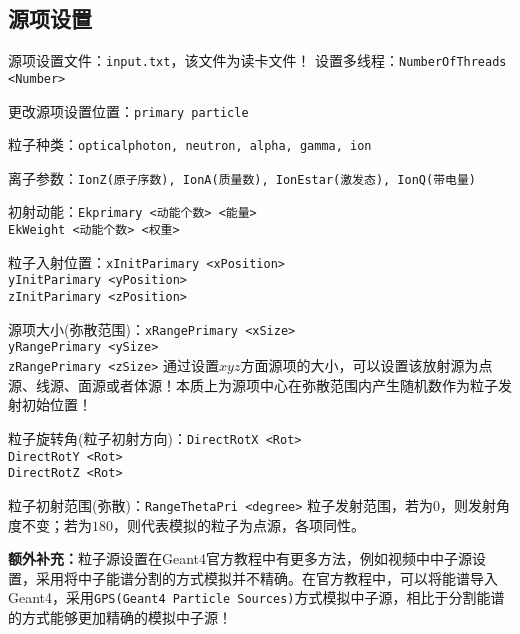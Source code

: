 \documentclass{article}
\begin{document}
\subsection{源项设置}
源项设置文件：\texttt{input.txt}，该文件为读卡文件！
\newline
设置多线程：\texttt{NumberOfThreads <Number>}

更改源项设置位置：\texttt{primary particle}

粒子种类：\texttt{opticalphoton, neutron, alpha, gamma, ion}

离子参数：\texttt{IonZ(原子序数), IonA(质量数), IonEstar(激发态), IonQ(带电量)}

初射动能：\texttt{Ekprimary <动能个数> <能量>} \\
\hspace*{2.5cm} \texttt{EkWeight <动能个数> <权重>}

粒子入射位置：\texttt{xInitParimary <xPosition>} \\
\hspace*{3.2cm} \texttt{yInitParimary <yPosition>} \\
\hspace*{3.2cm} \texttt{zInitParimary <zPosition>}

源项大小(弥散范围)：\texttt{xRangePrimary <xSize>} \\
\hspace*{2.5cm} \texttt{yRangePrimary <ySize>} \\
\hspace*{2.5cm} \texttt{zRangePrimary <zSize>}
\newline
通过设置$ xyz $方面源项的大小，可以设置该放射源为点源、线源、面源或者体源！本质上为源项中心在弥散范围内产生随机数作为粒子发射初始位置！

粒子旋转角(粒子初射方向)：\texttt{DirectRotX <Rot>} \\
\hspace*{5.5cm} \texttt{DirectRotY <Rot>} \\
\hspace*{5.5cm} \texttt{DirectRotZ <Rot>}

粒子初射范围(弥散)：\texttt{RangeThetaPri <degree>}
\newline
粒子发射范围，若为$ 0 $，则发射角度不变；若为$ 180 $，则代表模拟的粒子为点源，各项同性。

\textbf{额外补充：}粒子源设置在Geant4官方教程中有更多方法，例如视频中中子源设置，采用将中子能谱分割的方式模拟并不精确。在官方教程中，可以将能谱导入Geant4，采用\texttt{GPS(Geant4 Particle Sources)}方式模拟中子源，相比于分割能谱的方式能够更加精确的模拟中子源！
\end{document}
